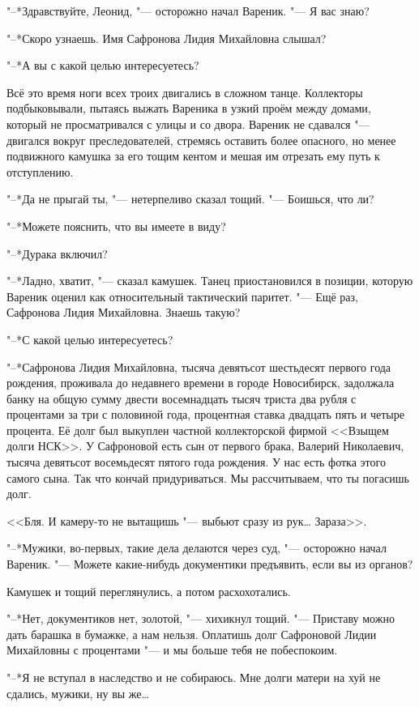 "--*Здравствуйте, Леонид, "--- осторожно начал Вареник.
"--- Я вас знаю?

"--*Скоро узнаешь.
Имя Сафронова Лидия Михайловна слышал?

"--*А вы с какой целью интересуетесь?

Всё это время ноги всех троих двигались в сложном танце.
Коллекторы подбыковывали, пытаясь выжать Вареника в узкий проём между домами, который не просматривался с улицы и со двора.
Вареник не сдавался "--- двигался вокруг преследователей, стремясь оставить более опасного, но менее подвижного камушка за его тощим кентом и мешая им отрезать ему путь к отступлению.

"--*Да не прыгай ты, "--- нетерпеливо сказал тощий.
"--- Боишься, что ли?

"--*Можете пояснить, что вы имеете в виду?

"--*Дурака включил?

"--*Ладно, хватит, "--- сказал камушек.
Танец приостановился в позиции, которую Вареник оценил как относительный тактический паритет.
"--- Ещё раз, Сафронова Лидия Михайловна.
Знаешь такую?

"--*С какой целью интересуетесь?

"--*Сафронова Лидия Михайловна, тысяча девятьсот шестьдесят первого года рождения, проживала до недавнего времени в городе Новосибирск, задолжала банку на общую сумму двести восемнадцать тысяч триста два рубля с процентами за три с половиной года, процентная ставка двадцать пять и четыре процента.
Её долг был выкуплен частной коллекторской фирмой <<Взыщем долги НСК>>.
У Сафроновой есть сын от первого брака, Валерий Николаевич, тысяча девятьсот восемьдесят пятого года рождения.
У нас есть фотка этого самого сына.
Так что кончай придуриваться.
Мы рассчитываем, что ты погасишь долг.

<<Бля.
И камеру-то не вытащишь "--- выбьют сразу из рук\ldots{}
Зараза>>.

"--*Мужики, во-первых, такие дела делаются через суд, "--- осторожно начал Вареник.
"--- Можете какие-нибудь документики предъявить, если вы из органов?

Камушек и тощий переглянулись, а потом расхохотались.

"--*Нет, документиков нет, золотой, "--- хихикнул тощий.
"--- Приставу можно дать барашка в бумажке, а нам нельзя.
Оплатишь долг Сафроновой Лидии Михайловны с процентами "--- и мы больше тебя не побеспокоим.

"--*Я не вступал в наследство и не собираюсь.
Мне долги матери на хуй не сдались, мужики, ну вы же\ldots{}

